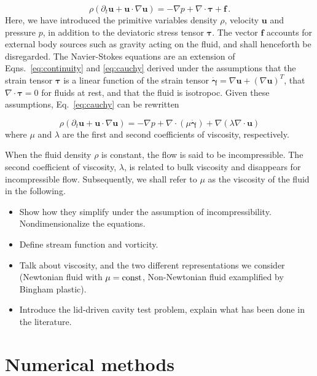 \documentclass[final,3p,twocolumn]{elsarticle}
\begin{document}
\begin{equation}
    \rho \left( \partial_t \bm{u} + \bm{u} \cdot \nabla \bm{u} \right) 
    = - \nabla p + \nabla \cdot \bm{\tau} + \bm{f} \,.
    \label{eq:cauchy}
\end{equation}
%
Here, we have introduced the primitive variables density $\rho$, velocity
$\bm{u}$ and pressure $p$, in addition to the deviatoric stress tensor
$\bm{\tau}$. The vector $\bm{f}$ accounts for external body sources such as
gravity acting on the fluid, and shall henceforth be disregarded. The
Navier-Stokes equations are an extension of Eqns.\ \eqref{eq:continuity} and
\eqref{eq:cauchy} derived under the assumptions that the strain tensor
$\bm{\tau}$ is a linear function of the strain tensor $\dot{\bm{\gamma}}=\nabla
\bm{u} + (\nabla \bm{u})^T$, that $\nabla \cdot \bm{\tau} = 0$ for fluids at
rest, and that the fluid is isotropoc. Given these assumptions, Eq.\
\eqref{eq:cauchy} can be rewritten

\begin{equation}
    \rho \left( \partial_t \bm{u} + \bm{u} \cdot \nabla \bm{u} \right) 
    = - \nabla p + \nabla \cdot \left( \mu \dot{\bm{\gamma}} \right) + \nabla
    \left( \lambda \nabla \cdot \bm{u} \right)
    \label{eq:compressible}
\end{equation}
%
where $\mu$ and $\lambda$ are the first and second coefficients of viscosity,
respectively. 

When the fluid density $\rho$ is constant, the flow is said to be incompressible. The
second coefficient of viscosity, $\lambda$, is related to bulk viscosity and
disappears for incompressible flow. Subsequently, we shall refer to $\mu$ as
the viscosity of the fluid in the following. 

\begin{itemize}
    \item Show how they simplify under the assumption of incompressibility.
        Nondimensionalize the equations. 
    \item Define stream function and vorticity.
    \item Talk about viscosity, and the two different representations we
        consider (Newtonian fluid with $\mu={\rm const}$, Non-Newtonian fluid
        examplified by Bingham plastic). 
    \item Introduce the lid-driven cavity test problem, explain what has been
        done in the literature. 
\end{itemize}

\section{Numerical methods}
\label{sec:numerical}
\end{document}
